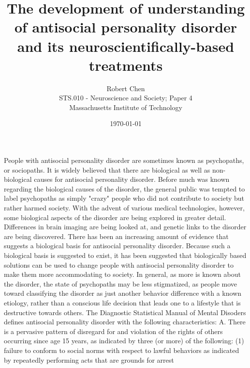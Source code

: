 
\title{
\vspace{-2cm}
The development of understanding of antisocial personality disorder and its neuroscientifically-based treatments\\
\vspace{-.5cm}
}

\author{
Robert Chen\\
\vspace{-1.6cm}
STS.010 - Neuroscience and Society; Paper 4\\
\vspace{-.0cm}
Massachusetts Institute of Technology
}
\date{
\today
}

\maketitle
	People with antisocial personality disorder are sometimes known as psychopaths, or sociopaths. It is widely believed that there are biological as well as non-biological causes for antisocial personality disorder. \cite{pickersgill}Before much was known regarding the biological causes of the disorder, the general public was tempted to label psychopaths as simply "crazy" people who did not contribute to society but rather harmed society. With the advent of various medical technologies, however, some biological aspects of the disorder are being explored in greater detail. Differences in brain imaging are being looked at, and genetic links to the disorder are being discovered. There has been an increasing amount of evidence that suggests a biological basis for antisocial personality disorder. Because such a biological basis is suggested to exist, it has been suggested that biologically based solutions can be used to change people with antisocial personality disorder to make them more accommodating to society.  In general, as more is known about the disorder, the state of psychopaths may be less stigmatized, as people move toward classifying the disorder as just another behavior difference with a known etiology, rather than a conscious life decision that leads one to a lifestyle that is destructive towards others. 
	The Diagnostic Statistical Manual of Mental Disoders defines antisocial personality disorder with the following characteristics:
A. There is a pervasive pattern of disregard for and violation of the rights of others occurring since age 15 years, as indicated by three (or more) of the following: 
    (1) failure to conform to social norms with respect to lawful behaviors as indicated by repeatedly performing acts that are grounds for arrest 
